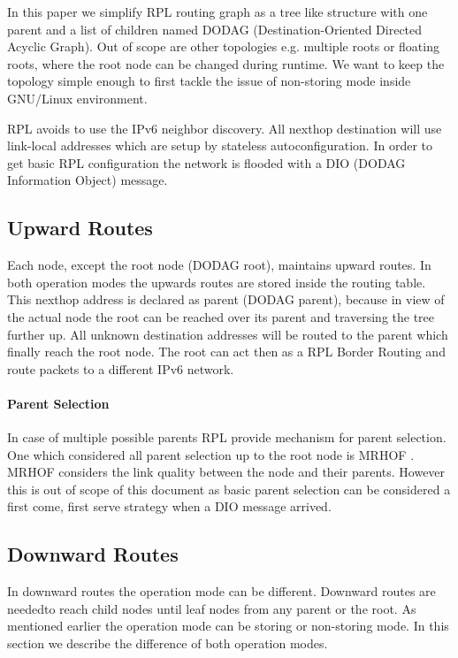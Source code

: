 \documentclass[letterpaper]{article}
\begin{document}
In this paper we simplify RPL routing graph as a tree like structure with one parent and a list of children named DODAG (Destination-Oriented Directed Acyclic Graph).
Out of scope are other topologies e.g. multiple roots or floating roots, where the root node can be changed during runtime.
We want to keep the topology simple enough to first tackle the issue of non-storing mode inside GNU/Linux environment.

RPL avoids to use the IPv6 neighbor discovery. All nexthop destination will use link-local addresses which are setup by stateless autoconfiguration.
In order to get basic RPL configuration the network is flooded with a DIO (DODAG Information Object) message.

\subsection{Upward Routes}

Each node, except the root node (DODAG root), maintains upward routes.
In both operation modes the upwards routes are stored inside the routing table.
This nexthop address is declared as parent (DODAG parent), because in view of
the actual node the root can be reached over its parent and traversing the tree further up.
All unknown destination addresses will be routed to the parent which finally reach the root node.
The root can act then as a RPL Border Routing and route packets to a different IPv6 network.

\paragraph{Parent Selection}

In case of multiple possible parents RPL provide mechanism for parent selection.
One which considered all parent selection up to the root node is MRHOF \cite{RFC6719}.
MRHOF considers the link quality between the node and their parents.
However this is out of scope of this document as basic parent selection can be considered a first come, first serve strategy when a DIO message arrived.

\subsection{Downward Routes}

In downward routes the operation mode can be different.
Downward routes are neededto reach child nodes until leaf nodes from any parent or the root.
As mentioned earlier the operation mode can be storing or non-storing mode.
In this section we describe the difference of both operation modes.
\end{document}
